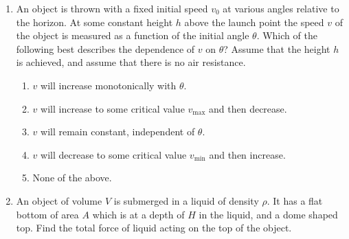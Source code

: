\documentclass[12pt,letterpaper]{article}
\begin{document}
\begin{enumerate}
\item
An object is thrown with a fixed initial speed $v_0$ at various angles relative to the horizon. At some constant height $h$ above the launch point the speed $v$ of the object is measured as a function of the initial angle $\theta$. Which of the following best describes the dependence of $v$ on $\theta$? Assume that the height $h$ is achieved, and assume that there is no air resistance.
\begin{enumerate}
\item $v$ will increase monotonically with $\theta$.
\item $v$ will increase to some critical value $v_\text{max}$ and then decrease.
\item $v$ will remain constant, independent of $\theta$.
\item $v$ will decrease to some critical value $v_\text{min}$ and then increase.
\item None of the above.
\end{enumerate}

\item
An object of volume $V$ is submerged in a liquid of density $\rho$. It has a flat bottom of area $A$ which is at a depth of $H$ in the liquid, and a dome shaped top. Find the total force of liquid acting on the top of the object.

\begin{tabular}{l r}


\end{tabular}
\end{enumerate}
\end{document}
